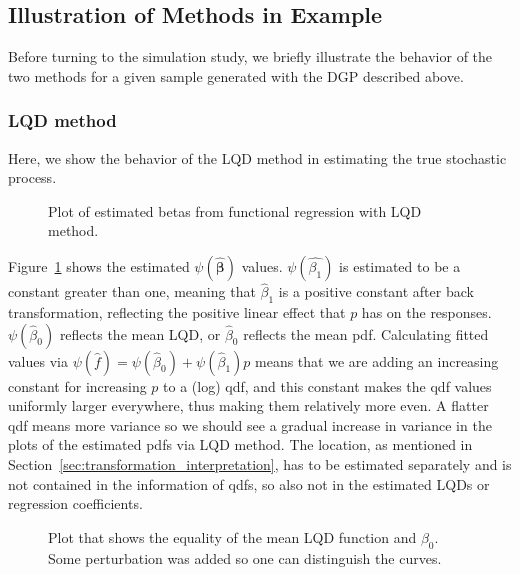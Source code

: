\subsection{Illustration of Methods in Example}
\label{sec:app_illustration}
Before turning to the simulation study, we briefly illustrate the behavior of the
two methods for a given sample generated with the DGP described above.

\subsubsection{LQD method}
\label{sec:app_lqd}
Here, we show the behavior of the LQD method in estimating the true stochastic process.

\begin{figure}[h!]
    \centering
    \resizebox{1\textwidth}{!}{}
    \caption[Estimated betas in LQD functional regression]{Plot of estimated betas from
    functional regression with LQD method.}
    \label{fig:betas}
\end{figure}
Figure~\ref{fig:betas} shows the estimated $\psi(\hat{\boldsymbol{\beta}})$ values. $\psi(\hat{\beta_1})$
is estimated to be a constant greater than one, meaning that $\hat{\beta}_1$ is a positive
constant after back transformation, reflecting the positive linear effect that $p$ has
on the responses. $\psi(\hat{\beta}_0)$ reflects the mean LQD, or $\hat{\beta}_0$ reflects
the mean pdf. Calculating fitted values via $\psi(\hat{f}) = \psi(\hat{\beta}_0) + \psi(\hat{\beta}_1) p$
means that we are adding an increasing constant for increasing $p$ to a (log) qdf, and
this constant makes the qdf values uniformly larger everywhere, thus making them relatively
more even. A flatter qdf means more variance so we should see a gradual increase in
variance  in the plots of the estimated pdfs via LQD method. The location, as mentioned
in Section~\ref{sec:transformation_interpretation}, has to be estimated separately and is not
contained in the information of qdfs, so also not in the estimated LQDs or regression
coefficients.
\begin{figure}[h!]
    \centering
    \resizebox{1\textwidth}{!}{}
    \caption[Equality of mean LQD function and $\psi(\hat{\beta}_0)$]{Plot that shows the equality
    of the mean LQD function and $\beta_0$. Some perturbation was added so one can
    distinguish the curves.}
    \label{fig:beta0vsmean}
\end{figure}

